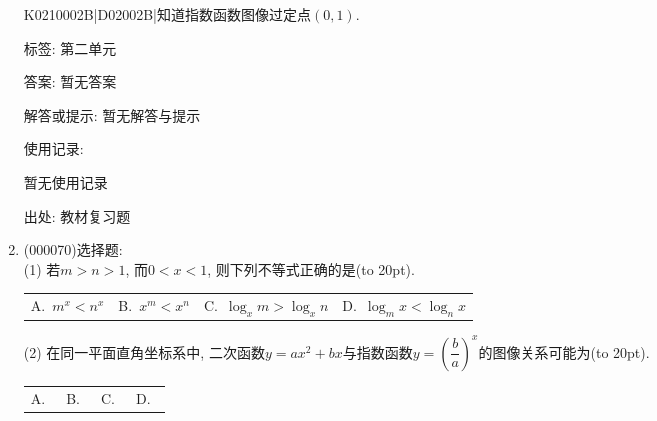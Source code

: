 \documentclass[10pt,a4paper]{article}
\newcommand{\bracket}[1]{(\hbox to #1pt{})}
\newcommand{\fourch}[4]{\par\begin{tabular}{p{.23\textwidth}p{.23\textwidth}p{.23\textwidth}p{.23\textwidth}}
A.~#1 &B.~#2& C.~#3& D.~#4
\end{tabular}}
\begin{document}
\begin{enumerate}[1.]
K0210002B|D02002B|知道指数函数图像过定点$(0,1)$.



标签: 第二单元

答案: 暂无答案

解答或提示: 暂无解答与提示

使用记录:

暂无使用记录


出处: 教材复习题
\item { (000070)}选择题:\\
(1) 若$m>n>1$, 而$0<x<1$, 则下列不等式正确的是\bracket{20}.
\fourch{$m^x<n^x$}{$x^m<x^n$}{$\log_x m>\log_x n$}{$\log_m x<\log_n x$}
(2) 在同一平面直角坐标系中, 二次函数$y=ax^2+bx$与指数函数$y=(\dfrac ba)^x$的图像关系可能为\bracket{20}.
\fourch{
\begin{tikzpicture}[scale = 0.5, >=latex]
    \draw [->] (-2.5,0) -- (2.5,0) node [below] {$x$};
    \draw [->] (0,-2.) -- (0,2.5) node [left] {$y$};
    \draw (0,0) node [below right] {$O$};
    \draw (-1,0.1) -- (-1,0) node [below] {$-1$};
    \draw (0.1,1) -- (0,1) node [left] {$1$};
    \draw [domain = -1.2:0.7,thick] plot (\x,{3*\x * (\x+0.5)});
    \draw [domain = -1.4:2,thick] plot (\x,{(0.5)^\x}); 
\end{tikzpicture}
}{
\begin{tikzpicture}[scale = 0.5, >=latex]
    \draw [->] (-2.5,0) -- (2.5,0) node [below] {$x$};
    \draw [->] (0,-2.) -- (0,2.5) node [left] {$y$};
    \draw (0,0) node [below left] {$O$};
    \draw (1,0.1) -- (1,0) node [below] {$1$};
    \draw (0.1,1) -- (0,1) node [above right] {$1$};
    \draw [domain = -0.5:1.5,thick] plot (\x,{3*\x*(\x-1)});
    \draw [domain = -1.4:2,thick] plot (\x,{(0.5)^\x}); 
\end{tikzpicture}
}{
\begin{tikzpicture}[scale = 0.5, >=latex]
    \draw [->] (-2.5,0) -- (2.5,0) node [below] {$x$};
    \draw [->] (0,-2.) -- (0,2.5) node [left] {$y$};
    \draw (0,0) node [below left] {$O$};
    \draw (1,0.1) -- (1,0) node [below] {$1$};
    \draw (0.1,1) -- (0,1) node [left] {$1$};
    \draw [domain = -0.5:2.5,thick] plot ({\x},{-\x*(\x-2)});
    \draw [domain = -1.4:2,thick] plot ({-\x},{(0.5)^\x}); 
\end{tikzpicture}
}{
\begin{tikzpicture}[scale = 0.5, >=latex]
    \draw [->] (-2.5,0) -- (2.5,0) node [below] {$x$};
    \draw [->] (0,-2.) -- (0,2.5) node [left] {$y$};
    \draw (0,0) node [below right] {$O$};
    \draw (-1,0.1) -- (-1,0) node [below] {$-1$};
    \draw (0.1,1) -- (0,1) node [right] {$1$};
    \draw [domain = -2.5:0.5,thick] plot ({\x},{-\x*(\x+2)});
    \draw [domain = -1.4:2,thick] plot ({\x},{(0.5)^\x}); 
\end{tikzpicture}   
}



\end{enumerate}
\end{document}
